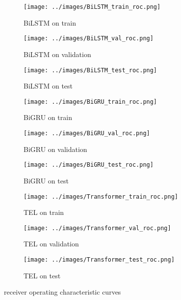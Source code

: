 \documentclass[utf8x]{ctexart}
\begin{document}
\begin{figure}[htb]
  \centering
  \begin{subfigure}[b]{0.32\textwidth}
    \centering
    \texttt{[image: ../images/BiLSTM\_train\_roc.png]}
    \caption{BiLSTM on train}
    \label{fig:BiLSTM_roc_train}
  \end{subfigure}
  \begin{subfigure}[b]{0.32\textwidth}
    \centering
    \texttt{[image: ../images/BiLSTM\_val\_roc.png]}
    \caption{BiLSTM on validation}
    \label{fig:BiLSTM_roc_val}
  \end{subfigure}
  \begin{subfigure}[b]{0.32\textwidth}
    \centering
    \texttt{[image: ../images/BiLSTM\_test\_roc.png]}
    \caption{BiLSTM on test}
    \label{fig:BiLSTM_roc_test}
  \end{subfigure}


  \begin{subfigure}[b]{0.32\textwidth}
    \centering
    \texttt{[image: ../images/BiGRU\_train\_roc.png]}
    \caption{BiGRU on train}
    \label{fig:BiGRU_roc_train}
  \end{subfigure}
  \begin{subfigure}[b]{0.32\textwidth}
    \centering
    \texttt{[image: ../images/BiGRU\_val\_roc.png]}
    \caption{BiGRU on validation}
    \label{fig:BiGRU_roc_val}
  \end{subfigure}
  \begin{subfigure}[b]{0.32\textwidth}
    \centering
    \texttt{[image: ../images/BiGRU\_test\_roc.png]}
    \caption{BiGRU on test}
    \label{fig:BiGRU_roc_test}
  \end{subfigure}


  \begin{subfigure}[b]{0.32\textwidth}
    \centering
    \texttt{[image: ../images/Transformer\_train\_roc.png]}
    \caption{TEL on train}
    \label{fig:Transformer_roc_train}
  \end{subfigure}
  \begin{subfigure}[b]{0.32\textwidth}
    \centering
    \texttt{[image: ../images/Transformer\_val\_roc.png]}
    \caption{TEL on validation}
    \label{fig:Transformer_roc_val}
  \end{subfigure}
  \begin{subfigure}[b]{0.32\textwidth}
    \centering
    \texttt{[image: ../images/Transformer\_test\_roc.png]}
    \caption{TEL on test}
    \label{fig:Transformer_roc_test}
  \end{subfigure}

  \caption{receiver operating characteristic curves}
  \label{fig:roc}
\end{figure}
\end{document}
